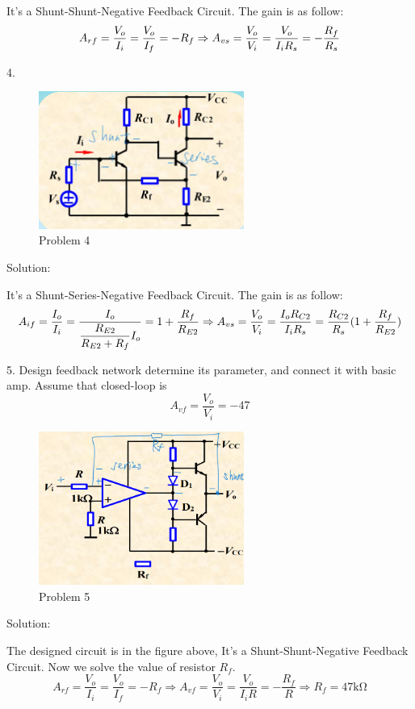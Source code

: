 \documentclass[a4paper,11pt,UTF8]{article}
\begin{document}
It's a Shunt-Shunt-Negative Feedback Circuit. The gain is as follow:
$$
	A_{rf}=\frac{V_o}{I_i}=\frac{V_o}{I_f}=-R_f\newline
	\Rightarrow A_{vs}=\frac{V_o}{V_i}=\frac{V_o}{I_iR_s}=-\frac{R_f}{R_s}
$$

4.
\begin{figure}[H]
	\centering
	\includegraphics[width=0.6\textwidth]{12.6}
	\caption{Problem 4}
\end{figure}
\noindent Solution:

It's a Shunt-Series-Negative Feedback Circuit. The gain is as follow:
$$
	A_{if}=\frac{I_o}{I_i}=\frac{I_o}{\dfrac{R_{E2}}{R_{E2}+R_f}I_o}=1+\frac{R_f}{R_{E2}}\newline
	\Rightarrow A_{vs}=\frac{V_o}{V_i}=\frac{I_o{R_{C2}}}{I_iR_s}=\frac{R_{C2}}{R_s}(1+\frac{R_f}{R_{E2}})
$$

5. Design feedback network determine its parameter, and connect it with basic amp. Assume that closed-loop is
$$
	A_{vf}=\frac{V_o}{V_i}=-47
$$
\begin{figure}[H]
	\centering
	\includegraphics[width=0.6\textwidth]{12.7}
	\caption{Problem 5}
\end{figure}
\noindent Solution:

The designed circuit is in the figure above, It's a Shunt-Shunt-Negative Feedback Circuit. Now we solve the value of resistor $R_f$.
$$
	A_{rf}=\frac{V_o}{I_i}=\frac{V_o}{I_f}=-R_f\Rightarrow A_{vf}=\frac{V_o}{V_i}=\frac{V_o}{I_iR}=-\frac{R_f}{R}\Rightarrow R_f=47\mathrm{k\Omega}
$$
\end{document}
